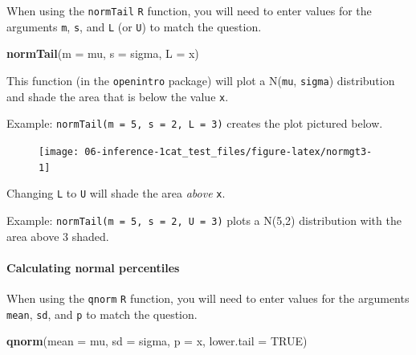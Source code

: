 \documentclass[
]{report}
\newenvironment{Shaded}{\begin{snugshade}}{\end{snugshade}}
\newcommand{\DataTypeTok}[1]{\textcolor[rgb]{0.13,0.29,0.53}{#1}}
\newcommand{\KeywordTok}[1]{\textcolor[rgb]{0.13,0.29,0.53}{\textbf{#1}}}
\newcommand{\NormalTok}[1]{#1}
\newcommand{\OtherTok}[1]{\textcolor[rgb]{0.56,0.35,0.01}{#1}}
\begin{document}
When using the \texttt{normTail} \texttt{R} function, you will need to enter values for the arguments \texttt{m}, \texttt{s}, and \texttt{L} (or \texttt{U}) to match the question.

\begin{Shaded}
\begin{Highlighting}[]
\KeywordTok{normTail}\NormalTok{(}\DataTypeTok{m =}\NormalTok{ mu, }\DataTypeTok{s =}\NormalTok{ sigma, }\DataTypeTok{L =}\NormalTok{ x)}
\end{Highlighting}
\end{Shaded}

This function (in the \texttt{openintro} package) will plot a N(\texttt{mu}, \texttt{sigma}) distribution and shade the area that is below the value \texttt{x}.

Example: \texttt{normTail(m\ =\ 5,\ s\ =\ 2,\ L\ =\ 3)} creates the plot pictured below.

\begin{figure}

{\centering \texttt{[image: 06-inference-1cat\_test\_files/figure-latex/normgt3-1]} 

}

\end{figure}

Changing \texttt{L} to \texttt{U} will shade the area \emph{above} \texttt{x}.

Example: \texttt{normTail(m\ =\ 5,\ s\ =\ 2,\ U\ =\ 3)} plots a N(5,2) distribution with the area above 3 shaded.

\hypertarget{calculating-normal-percentiles}{%
\paragraph*{Calculating normal percentiles}\label{calculating-normal-percentiles}}

When using the \texttt{qnorm} \texttt{R} function, you will need to enter values for the arguments \texttt{mean}, \texttt{sd}, and \texttt{p} to match the question.

\begin{Shaded}
\begin{Highlighting}[]
\KeywordTok{qnorm}\NormalTok{(}\DataTypeTok{mean =}\NormalTok{ mu, }\DataTypeTok{sd =}\NormalTok{ sigma, }\DataTypeTok{p =}\NormalTok{ x, }\DataTypeTok{lower.tail =} \OtherTok{TRUE}\NormalTok{)}
\end{Highlighting}
\end{Shaded}
\end{document}
